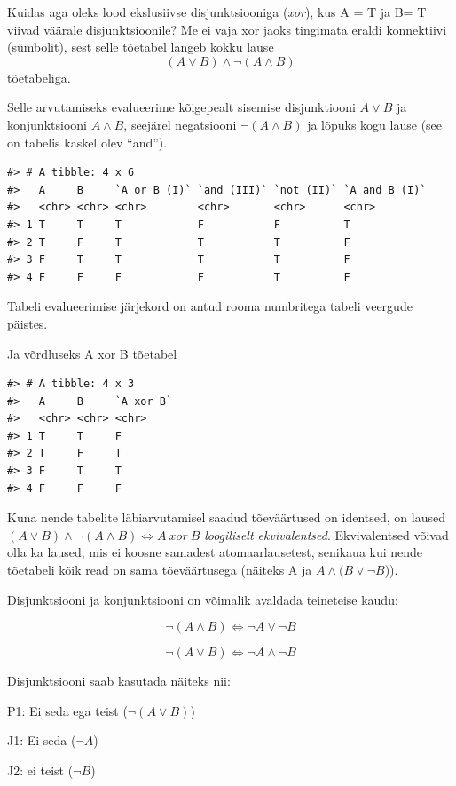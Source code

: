 \documentclass[]{book}
\begin{document}
Kuidas aga oleks lood ekslusiivse disjunktsiooniga (\emph{xor}), kus A = T ja B= T viivad väärale disjunktsioonile? Me ei vaja xor jaoks tingimata eraldi konnektiivi (sümbolit), sest selle tõetabel langeb kokku lause \[(A \lor B) \land \neg (A \land B)\] tõetabeliga.

Selle arvutamiseks evalueerime kõigepealt sisemise disjunktiooni \(A \lor B\) ja konjunktsiooni \(A \land B\), seejärel negatsiooni \(\neg (A \land B)\) ja lõpuks kogu lause (see on tabelis kaskel olev ``and'').

\begin{verbatim}
#> # A tibble: 4 x 6
#>   A     B     `A or B (I)` `and (III)` `not (II)` `A and B (I)`
#>   <chr> <chr> <chr>        <chr>       <chr>      <chr>        
#> 1 T     T     T            F           F          T            
#> 2 T     F     T            T           T          F            
#> 3 F     T     T            T           T          F            
#> 4 F     F     F            F           T          F
\end{verbatim}

Tabeli evalueerimise järjekord on antud rooma numbritega tabeli veergude päistes.

Ja võrdluseks A xor B tõetabel

\begin{verbatim}
#> # A tibble: 4 x 3
#>   A     B     `A xor B`
#>   <chr> <chr> <chr>    
#> 1 T     T     F        
#> 2 T     F     T        
#> 3 F     T     T        
#> 4 F     F     F
\end{verbatim}

Kuna nende tabelite läbiarvutamisel saadud tõeväärtused on identsed, on laused \((A \lor B) \land \neg (A \land B) \Leftrightarrow A ~ xor ~B\) \emph{loogiliselt ekvivalentsed}. Ekvivalentsed võivad olla ka laused, mis ei koosne samadest atomaarlausetest, senikaua kui nende tõetabeli kõik read on sama tõeväärtusega (näiteks A ja \(A\land(B\lor\neg B\))).

Disjunktsiooni ja konjunktsiooni on võimalik avaldada teineteise kaudu:

\[\neg (A \land B) \Leftrightarrow \neg A \lor \neg B\]

\[\neg (A \lor B) \Leftrightarrow \neg A \land \neg B\]

Disjunktsiooni saab kasutada näiteks nii:

P1: Ei seda ega teist (\(\neg (A \lor B)\))

J1: Ei seda (\(\neg A\))

J2: ei teist (\(\neg B\))
\end{document}
